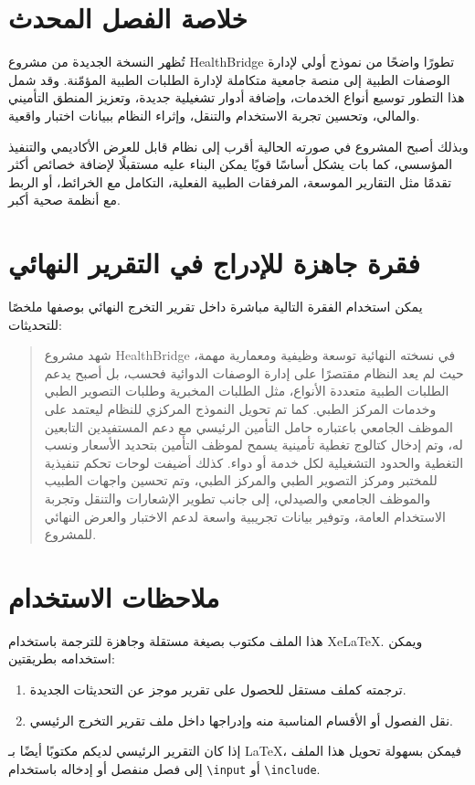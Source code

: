 \documentclass[12pt,a4paper]{report}
\begin{document}
\chapter{خلاصة الفصل المحدث}

تُظهر النسخة الجديدة من مشروع \textenglish{HealthBridge} تطورًا واضحًا من نموذج أولي لإدارة الوصفات الطبية إلى منصة جامعية متكاملة لإدارة الطلبات الطبية المؤمّنة. وقد شمل هذا التطور توسيع أنواع الخدمات، وإضافة أدوار تشغيلية جديدة، وتعزيز المنطق التأميني والمالي، وتحسين تجربة الاستخدام والتنقل، وإثراء النظام ببيانات اختبار واقعية.

وبذلك أصبح المشروع في صورته الحالية أقرب إلى نظام قابل للعرض الأكاديمي والتنفيذ المؤسسي، كما بات يشكل أساسًا قويًا يمكن البناء عليه مستقبلًا لإضافة خصائص أكثر تقدمًا مثل التقارير الموسعة، المرفقات الطبية الفعلية، التكامل مع الخرائط، أو الربط مع أنظمة صحية أكبر.

\chapter{فقرة جاهزة للإدراج في التقرير النهائي}

يمكن استخدام الفقرة التالية مباشرة داخل تقرير التخرج النهائي بوصفها ملخصًا للتحديثات:

\begin{quote}
شهد مشروع \textenglish{HealthBridge} في نسخته النهائية توسعة وظيفية ومعمارية مهمة، حيث لم يعد النظام مقتصرًا على إدارة الوصفات الدوائية فحسب، بل أصبح يدعم الطلبات الطبية متعددة الأنواع، مثل الطلبات المخبرية وطلبات التصوير الطبي وخدمات المركز الطبي. كما تم تحويل النموذج المركزي للنظام ليعتمد على الموظف الجامعي باعتباره حامل التأمين الرئيسي مع دعم المستفيدين التابعين له، وتم إدخال كتالوج تغطية تأمينية يسمح لموظف التأمين بتحديد الأسعار ونسب التغطية والحدود التشغيلية لكل خدمة أو دواء. كذلك أضيفت لوحات تحكم تنفيذية للمختبر ومركز التصوير الطبي والمركز الطبي، وتم تحسين واجهات الطبيب والموظف الجامعي والصيدلي، إلى جانب تطوير الإشعارات والتنقل وتجربة الاستخدام العامة، وتوفير بيانات تجريبية واسعة لدعم الاختبار والعرض النهائي للمشروع.
\end{quote}

\chapter{ملاحظات الاستخدام}

هذا الملف مكتوب بصيغة مستقلة وجاهزة للترجمة باستخدام \textenglish{XeLaTeX}. ويمكن استخدامه بطريقتين:

\begin{enumerate}[itemsep=4pt]
  \item ترجمته كملف مستقل للحصول على تقرير موجز عن التحديثات الجديدة.
  \item نقل الفصول أو الأقسام المناسبة منه وإدراجها داخل ملف تقرير التخرج الرئيسي.
\end{enumerate}

إذا كان التقرير الرئيسي لديكم مكتوبًا أيضًا بـ \LaTeX، فيمكن بسهولة تحويل هذا الملف إلى فصل منفصل أو إدخاله باستخدام \texttt{\textbackslash input} أو \texttt{\textbackslash include}.
\end{document}
